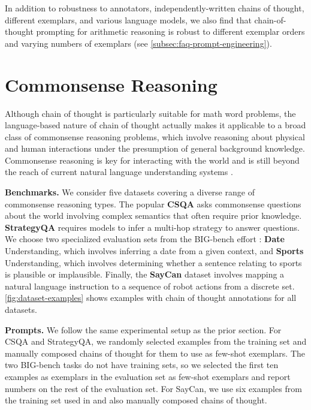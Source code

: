 \documentclass[]{article}
\theoremstyle{plain}
\theoremstyle{definition}
\theoremstyle{remark}
\begin{document}
In addition to robustness to annotators, independently-written chains of thought, different exemplars, and various language models, we also find that chain-of-thought prompting for arithmetic reasoning is robust to different exemplar orders and varying numbers of exemplars (see \cref{subsec:faq-prompt-engineering}).

\section{Commonsense Reasoning}\label{sec:commonsense-reasoning}

Although chain of thought is particularly suitable for math word problems, the language-based nature of chain of thought actually makes it applicable to a broad class of commonsense reasoning problems, which involve reasoning about physical and human interactions under the presumption of general background knowledge.
Commonsense reasoning is key for interacting with the world and is still beyond the reach of current natural language understanding systems \citep{talmor2022commonsenseqa}.

\textbf{Benchmarks.}
We consider five datasets covering a diverse range of commonsense reasoning types.
The popular \textbf{CSQA} \citep{talmor-etal-2019-commonsenseqa} asks commonsense questions about the world involving complex semantics that often require prior knowledge.
\textbf{StrategyQA} \citep{geva-etal-2021-aristotle} requires models to infer a multi-hop strategy to answer questions.
We choose two specialized evaluation sets from the BIG-bench effort \citep{bigbench}: \textbf{Date} Understanding, which involves inferring a date from a given context, and \textbf{Sports} Understanding, which involves determining whether a sentence relating to sports is plausible or implausible.
Finally, the \textbf{SayCan} dataset \citep{ahn2022can} involves mapping a natural language instruction to a sequence of robot actions from a discrete set.
\cref{fig:dataset-examples} shows examples with chain of thought annotations for all datasets.

\textbf{Prompts.}
We follow the same experimental setup as the prior section. 
For CSQA and StrategyQA, we randomly selected examples from the training set and manually composed chains of thought for them to use as few-shot exemplars.
The two BIG-bench tasks do not have training sets, so we selected the first ten examples as exemplars in the evaluation set as few-shot exemplars and report numbers on the rest of the evaluation set.
For SayCan, we use six examples from the training set used in \citet{ahn2022can} and also manually composed chains of thought.
\end{document}
